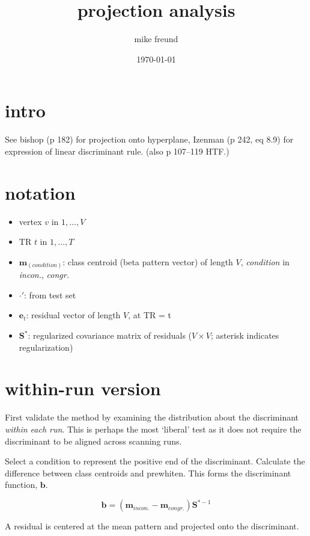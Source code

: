 \documentclass{article}\usepackage[]{graphicx}\usepackage[]{color}
\begin{document}
\title{projection analysis}
\author{mike freund}
\date{\today}
\maketitle

\section*{intro}
See bishop (p 182) for projection onto hyperplane, Izenman (p 242, eq 8.9) for expression of linear discriminant rule. (also p 107--119 HTF.)

\section*{notation}

\begin{itemize}
  \item vertex $v \text{ in } 1, \dots, V$
  \item TR $t \text{ in } 1, \dots, T$
  \item $\mathbf{m}_\mathit{(condition)}$: class centroid (beta pattern vector) of length $V$, \textit{condition} in \textit{incon.}, \textit{congr.}
  \item $\cdot'$: from test set
  \item $\mathbf{e}_t$: residual vector of length $V$, at TR = t
  \item $\mathbf{S^*}$: regularized covariance matrix of residuals ($V \times V$; asterisk indicates regularization)
\end{itemize}


\section*{within-run version}

First validate the method by examining the distribution about the discriminant \textit{within each run}.
This is perhaps the most `liberal' test as it does not require the discriminant to be aligned across scanning runs.

Select a condition to represent the positive end of the discriminant. 
Calculate the difference between class centroids and prewhiten.
This forms the discriminant function, $\mathbf{b}$.

\[\mathbf{b} = (\mathbf{m}_\mathit{incon.} - \mathbf{m}_\mathit{congr.}) \mathbf{S}^{*-1}\]

A residual is centered at the mean pattern and projected onto the discriminant.
\end{document}
